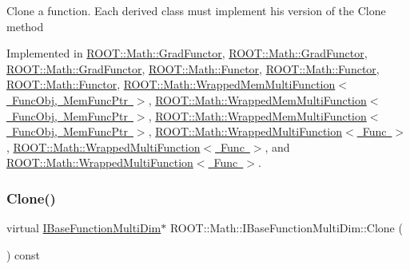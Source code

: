 Clone a function. Each derived class must implement his version of the Clone method 

Implemented in \mbox{\hyperlink{classROOT_1_1Math_1_1GradFunctor_a21093c0d3001069e49ce6278b5a32a40}{R\+O\+O\+T\+::\+Math\+::\+Grad\+Functor}}, \mbox{\hyperlink{classROOT_1_1Math_1_1GradFunctor_a21093c0d3001069e49ce6278b5a32a40}{R\+O\+O\+T\+::\+Math\+::\+Grad\+Functor}}, \mbox{\hyperlink{classROOT_1_1Math_1_1GradFunctor_a21093c0d3001069e49ce6278b5a32a40}{R\+O\+O\+T\+::\+Math\+::\+Grad\+Functor}}, \mbox{\hyperlink{classROOT_1_1Math_1_1Functor_a989f9b6dd160ebe03911cdee00dacaad}{R\+O\+O\+T\+::\+Math\+::\+Functor}}, \mbox{\hyperlink{classROOT_1_1Math_1_1Functor_a989f9b6dd160ebe03911cdee00dacaad}{R\+O\+O\+T\+::\+Math\+::\+Functor}}, \mbox{\hyperlink{classROOT_1_1Math_1_1Functor_a989f9b6dd160ebe03911cdee00dacaad}{R\+O\+O\+T\+::\+Math\+::\+Functor}}, \mbox{\hyperlink{classROOT_1_1Math_1_1WrappedMemMultiFunction_ab9f49fc9a151e8d921dbe9cb148c1fc8}{R\+O\+O\+T\+::\+Math\+::\+Wrapped\+Mem\+Multi\+Function$<$ Func\+Obj, Mem\+Func\+Ptr $>$}}, \mbox{\hyperlink{classROOT_1_1Math_1_1WrappedMemMultiFunction_ab9f49fc9a151e8d921dbe9cb148c1fc8}{R\+O\+O\+T\+::\+Math\+::\+Wrapped\+Mem\+Multi\+Function$<$ Func\+Obj, Mem\+Func\+Ptr $>$}}, \mbox{\hyperlink{classROOT_1_1Math_1_1WrappedMemMultiFunction_ab9f49fc9a151e8d921dbe9cb148c1fc8}{R\+O\+O\+T\+::\+Math\+::\+Wrapped\+Mem\+Multi\+Function$<$ Func\+Obj, Mem\+Func\+Ptr $>$}}, \mbox{\hyperlink{classROOT_1_1Math_1_1WrappedMultiFunction_aafa24e359a607b4278f1bf238bdbc336}{R\+O\+O\+T\+::\+Math\+::\+Wrapped\+Multi\+Function$<$ Func $>$}}, \mbox{\hyperlink{classROOT_1_1Math_1_1WrappedMultiFunction_aafa24e359a607b4278f1bf238bdbc336}{R\+O\+O\+T\+::\+Math\+::\+Wrapped\+Multi\+Function$<$ Func $>$}}, and \mbox{\hyperlink{classROOT_1_1Math_1_1WrappedMultiFunction_aafa24e359a607b4278f1bf238bdbc336}{R\+O\+O\+T\+::\+Math\+::\+Wrapped\+Multi\+Function$<$ Func $>$}}.

\mbox{\label{classROOT_1_1Math_1_1IBaseFunctionMultiDim_a57939204b1f525b43835b42e0635dd3b}} 
\subsubsection{\texorpdfstring{Clone()}{Clone()}\hspace{0.1cm}{\footnotesize\ttfamily [3/3]}}
{\footnotesize\ttfamily virtual \mbox{\hyperlink{classROOT_1_1Math_1_1IBaseFunctionMultiDim}{I\+Base\+Function\+Multi\+Dim}}$\ast$ R\+O\+O\+T\+::\+Math\+::\+I\+Base\+Function\+Multi\+Dim\+::\+Clone (\begin{DoxyParamCaption}{ }\end{DoxyParamCaption}) const\hspace{0.3cm}{\ttfamily [pure virtual]}}

